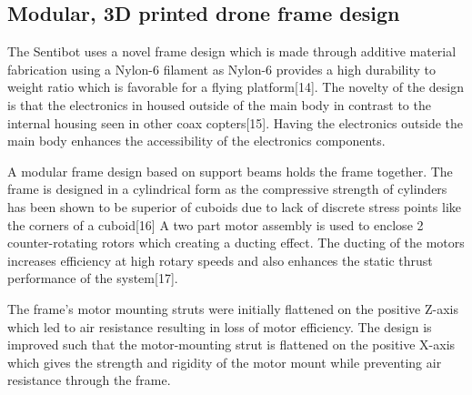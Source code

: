 \documentclass[12pt]{article}
\begin{document}
\subsection{Modular, 3D printed drone frame design}

The Sentibot uses a novel frame design which is made through additive material fabrication using a Nylon-6 filament as Nylon-6 provides a high durability to weight ratio which is favorable for a flying platform[14]. The novelty of the design is that the electronics in housed outside of the main body in contrast to the internal housing seen in other coax copters[15]. Having the electronics outside the main body enhances the accessibility of the electronics components. 

A modular frame design based on support beams holds the frame together. The frame is designed in a cylindrical form as the compressive strength of cylinders has been shown to be superior of cuboids due to lack of discrete stress points like the corners of a cuboid[16] A two part motor assembly is used to enclose 2 counter-rotating rotors which creating a ducting effect. The ducting of the motors increases efficiency at high rotary speeds and also enhances the static thrust performance of the system[17].

The frame's motor mounting struts were initially flattened on the positive Z-axis which led to air resistance resulting in loss of motor efficiency. The design is improved such that the motor-mounting strut is flattened on the positive X-axis which gives the strength and rigidity of the motor mount while preventing air resistance through the frame.
\end{document}
